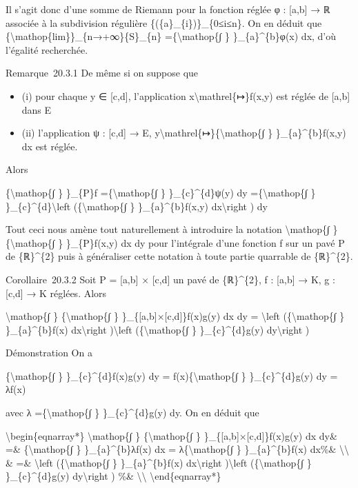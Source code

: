 \documentclass[]{article}
\begin{document}
Il s'agit donc d'une somme de Riemann pour la fonction réglée φ :
{[}a,b{]} → ℝ associée à la subdivision régulière
\{(\{a\}\_\{i\})\}\_\{0≤i≤n\}. On en déduit que
\{\textbackslash{}mathop\{lim\}\}\_\{n→+∞\}\{S\}\_\{n\}
=\{\textbackslash{}mathop\{∫ \} \}\_\{a\}\^{}\{b\}φ(x) dx, d'où
l'égalité recherchée.

Remarque~20.3.1 De même si on suppose que

\begin{itemize}
\itemsep1pt\parskip0pt
\item
  (i) pour chaque y ∈ {[}c,d{]}, l'application
  x\textbackslash{}mathrel\{↦\}f(x,y) est réglée de {[}a,b{]} dans E
\item
  (ii) l'application ψ : {[}c,d{]} → E,
  y\textbackslash{}mathrel\{↦\}\{\textbackslash{}mathop\{∫ \}
  \}\_\{a\}\^{}\{b\}f(x,y) dx est réglée.
\end{itemize}

Alors

\{\textbackslash{}mathop\{∫ \} \}\_\{P\}f =\{\textbackslash{}mathop\{∫
\} \}\_\{c\}\^{}\{d\}ψ(y) dy =\{\textbackslash{}mathop\{∫ \}
\}\_\{c\}\^{}\{d\}\textbackslash{}left (\{\textbackslash{}mathop\{∫ \}
\}\_\{a\}\^{}\{b\}f(x,y) dx\textbackslash{}right ) dy

Tout ceci nous amène tout naturellement à introduire la notation
\textbackslash{}mathop\{∫ \} \{\textbackslash{}mathop\{∫ \}
\}\_\{P\}f(x,y) dx dy pour l'intégrale d'une fonction f sur un pavé P de
\{ℝ\}\^{}\{2\} puis à généraliser cette notation à toute partie
quarrable de \{ℝ\}\^{}\{2\}.

Corollaire~20.3.2 Soit P = {[}a,b{]} × {[}c,d{]} un pavé de
\{ℝ\}\^{}\{2\}, f : {[}a,b{]} → K, g : {[}c,d{]} → K réglées. Alors

\textbackslash{}mathop\{∫ \} \{\textbackslash{}mathop\{∫ \}
\}\_\{{[}a,b{]}×{[}c,d{]}\}f(x)g(y) dx dy = \textbackslash{}left
(\{\textbackslash{}mathop\{∫ \} \}\_\{a\}\^{}\{b\}f(x)
dx\textbackslash{}right )\textbackslash{}left
(\{\textbackslash{}mathop\{∫ \} \}\_\{c\}\^{}\{d\}g(y)
dy\textbackslash{}right )

Démonstration On a

\{\textbackslash{}mathop\{∫ \} \}\_\{c\}\^{}\{d\}f(x)g(y) dy =
f(x)\{\textbackslash{}mathop\{∫ \} \}\_\{c\}\^{}\{d\}g(y) dy = λf(x)

avec λ =\{\textbackslash{}mathop\{∫ \} \}\_\{c\}\^{}\{d\}g(y) dy. On en
déduit que

\textbackslash{}begin\{eqnarray*\} \textbackslash{}mathop\{∫ \}
\{\textbackslash{}mathop\{∫ \} \}\_\{{[}a,b{]}×{[}c,d{]}\}f(x)g(y) dx
dy\& =\& \{\textbackslash{}mathop\{∫ \} \}\_\{a\}\^{}\{b\}λf(x) dx =
λ\{\textbackslash{}mathop\{∫ \} \}\_\{a\}\^{}\{b\}f(x) dx\%\&
\textbackslash{}\textbackslash{} \& =\& \textbackslash{}left
(\{\textbackslash{}mathop\{∫ \} \}\_\{a\}\^{}\{b\}f(x)
dx\textbackslash{}right )\textbackslash{}left
(\{\textbackslash{}mathop\{∫ \} \}\_\{c\}\^{}\{d\}g(y)
dy\textbackslash{}right ) \%\& \textbackslash{}\textbackslash{}
\textbackslash{}end\{eqnarray*\}
\end{document}
